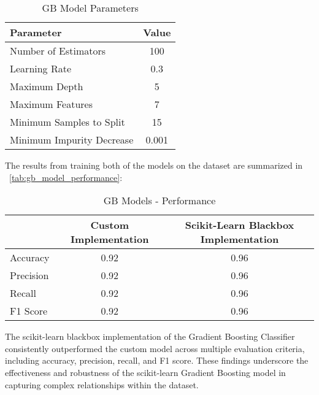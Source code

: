 \begin{table}[H]
  \centering
  \begin{tabular}{lc}
    \toprule
    \textbf{Parameter}        & \textbf{Value} \\
    \midrule
    Number of Estimators      & 100            \\
    Learning Rate             & 0.3            \\
    Maximum Depth             & 5              \\
    Maximum Features          & 7              \\
    Minimum Samples to Split  & 15             \\
    Minimum Impurity Decrease & 0.001          \\
    \bottomrule
  \end{tabular}
  \caption{GB Model Parameters}
  \label{tab:gb_modelparams}
\end{table}

The results from training both of the models on the dataset are summarized in ~\autoref{tab:gb_model_performance}:

\begin{table}[H]
  \centering
  \begin{tabular}{lcc}
    \toprule
              & \textbf{Custom Implementation} & \textbf{Scikit-Learn Blackbox Implementation} \\
    \midrule
    Accuracy  & 0.92                           & 0.96                                          \\
    Precision & 0.92                           & 0.96                                          \\
    Recall    & 0.92                           & 0.96                                          \\
    F1 Score  & 0.92                           & 0.96                                          \\
    \bottomrule
  \end{tabular}
  \caption{GB Models - Performance}
  \label{tab:gb_model_performance}
\end{table}

The scikit-learn blackbox implementation of the Gradient Boosting Classifier consistently outperformed the custom model across multiple evaluation criteria, including accuracy, precision, recall, and F1 score. These findings underscore the effectiveness and robustness of the scikit-learn Gradient Boosting model in capturing complex relationships within the dataset.